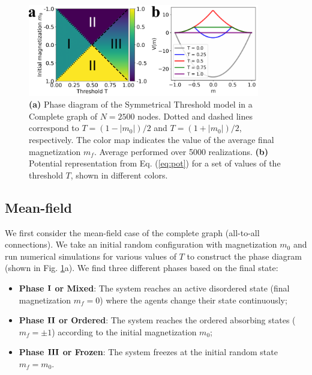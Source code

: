 \begin{figure}
	\centering \captionsetup{font=sf}
	\includegraphics[width=0.9\textwidth]{Figs/Aging_STM/FIG1.pdf}
	\caption[Phases of the Symmetrical Threshold model]{\textbf{(a)} Phase diagram of the Symmetrical Threshold model in a Complete graph of $N = 2500$ nodes. Dotted and dashed lines correspond to $T = (1-|m_0|)/2$ and $T = (1+|m_0|)/2$, respectively. The color map indicates the value of the average final magnetization $m_f$.	Average performed over 5000 realizations. \textbf{(b)} Potential representation from Eq. (\ref{eq:pot}) for a set of values of the threshold $T$, shown in different colors.}
	\label{COM_LAT_PD}
\end{figure}

\subsection{Mean-field}

We first consider the mean-field case of the complete graph (all-to-all connections). We take an initial random configuration with magnetization $m_0$ and run numerical simulations for various values of $T$ to construct the phase diagram (shown in Fig. \ref{COM_LAT_PD}a). We find three different phases based on the final state:

\begin{itemize}
	\item \textbf{Phase ${\rm {\bf I}}$ or Mixed}: The system reaches an active disordered state (final magnetization $m_f = 0$) where the agents change their state continuously;
	\item \textbf{Phase ${\rm {\bf II}}$ or Ordered}: The system reaches the ordered absorbing states ($m_f = \pm 1$) according to the initial magnetization $m_0$;
	\item \textbf{Phase ${\rm {\bf III}}$ or Frozen}: The system freezes at the initial random state $m_f = m_0$.
\end{itemize}

